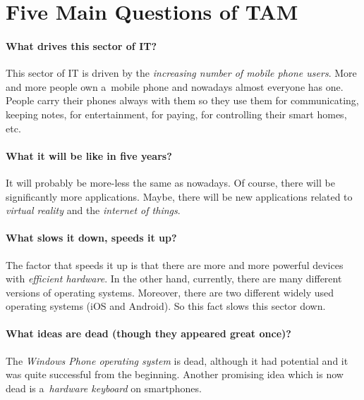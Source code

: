 \documentclass[12pt, a4paper, titlepage, final]{article}
\begin{document}

\section*{Five Main Questions of TAM}

\paragraph{What drives this sector of IT? \\}

This sector of IT is driven by the \emph{increasing number of mobile phone
users}. More and more people own a~mobile phone and nowadays almost everyone
has one. People carry their phones always with them so they use them for
communicating, keeping notes, for entertainment, for paying, for controlling
their smart homes, etc.

\paragraph{What it will be like in five years? \\}

It will probably be more-less the same as nowadays. Of course, there will be
significantly more applications. Maybe, there will be new applications
related to \emph{virtual reality} and the \emph{internet of things}.

\paragraph{What slows it down, speeds it up? \\}

The factor that speeds it up is that there are more and more powerful devices
with \emph{efficient hardware}. In the other hand, currently, there are many
different versions of operating systems. Moreover, there are two
different widely used operating systems (iOS and Android). So this fact
slows this sector down.

\paragraph{What ideas are dead (though they appeared great once)? \\}

The \emph{Windows Phone operating system} is dead, although it had potential
and it was quite successful from the beginning. Another promising idea which
is now dead is a~\emph{hardware keyboard} on smartphones.
\end{document}
